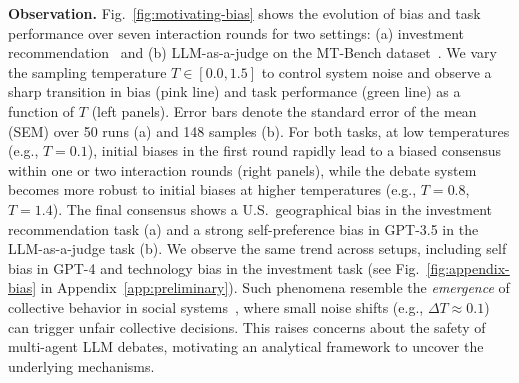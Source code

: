 \documentclass{article}
\theoremstyle{plain}
\theoremstyle{definition}
\theoremstyle{remark}
\begin{document}
\textbf{Observation. }
Fig.~\ref{fig:motivating-bias} shows the evolution of bias and task performance over seven interaction rounds for two settings: (a) investment recommendation~\cite{winder2025biased} and (b) LLM-as-a-judge on the MT-Bench dataset~\cite{zeng2024llmbar}. We vary the sampling temperature $T \in [0.0, 1.5]$ to control system noise and observe a sharp transition in bias (\textcolor[RGB]{217, 95, 122}{pink line}) and task performance (\textcolor[RGB]{27,158,158}{green line}) as a function of $T$ (left panels). 
Error bars denote the standard error of the mean (SEM) over 50 runs (a) and 148 samples (b).
For both tasks, at low temperatures (e.g., \textcolor[RGB]{69,117,180}{$T=0.1$}),
initial biases in the first round rapidly lead to a biased consensus within one or two interaction rounds (right panels), while the debate system becomes more robust to initial biases at higher temperatures (e.g., \textcolor[RGB]{171,221,164}{$T=0.8$}, \textcolor[RGB]{253,174,97}{$T=1.4$}). 
The final consensus shows a U.S.\ geographical bias in the investment recommendation task (a) and a strong self-preference bias in GPT-3.5 in the LLM-as-a-judge task (b).
We observe the same trend across setups, including self bias in GPT-4 and technology bias in the investment task (see Fig.~\ref{fig:appendix-bias} in Appendix~\ref{app:preliminary}). 
Such phenomena resemble the \textsl{emergence} of collective behavior in social systems~\citep{sawyer2001emergence}, where small noise shifts (e.g., $\Delta T \approx 0.1$) can trigger unfair collective decisions. 
This raises concerns about the safety of multi-agent LLM debates, motivating an analytical framework to uncover the underlying mechanisms. 
\end{document}
